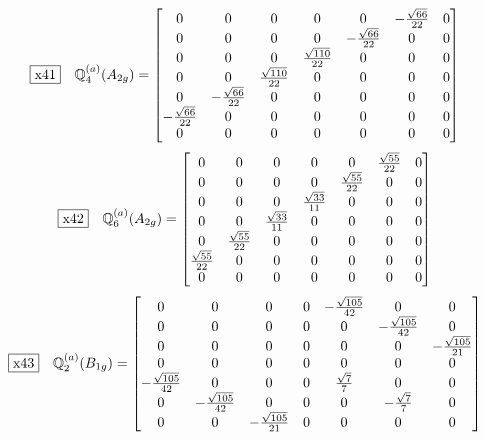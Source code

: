 \documentclass[fleqn,10pt,landscape]{jsarticle}
\begin{document}
\begin{dmath*}
\fbox{x41}\quad \mathbb{Q}_{4}^{(a)}(A_{2g})=\begin{bmatrix} 0 & 0 & 0 & 0 & 0 & - \frac{\sqrt{66}}{22} & 0 \\ 0 & 0 & 0 & 0 & - \frac{\sqrt{66}}{22} & 0 & 0 \\ 0 & 0 & 0 & \frac{\sqrt{110}}{22} & 0 & 0 & 0 \\ 0 & 0 & \frac{\sqrt{110}}{22} & 0 & 0 & 0 & 0 \\ 0 & - \frac{\sqrt{66}}{22} & 0 & 0 & 0 & 0 & 0 \\ - \frac{\sqrt{66}}{22} & 0 & 0 & 0 & 0 & 0 & 0 \\ 0 & 0 & 0 & 0 & 0 & 0 & 0 \end{bmatrix}
\end{dmath*}
\begin{dmath*}
\fbox{x42}\quad \mathbb{Q}_{6}^{(a)}(A_{2g})=\begin{bmatrix} 0 & 0 & 0 & 0 & 0 & \frac{\sqrt{55}}{22} & 0 \\ 0 & 0 & 0 & 0 & \frac{\sqrt{55}}{22} & 0 & 0 \\ 0 & 0 & 0 & \frac{\sqrt{33}}{11} & 0 & 0 & 0 \\ 0 & 0 & \frac{\sqrt{33}}{11} & 0 & 0 & 0 & 0 \\ 0 & \frac{\sqrt{55}}{22} & 0 & 0 & 0 & 0 & 0 \\ \frac{\sqrt{55}}{22} & 0 & 0 & 0 & 0 & 0 & 0 \\ 0 & 0 & 0 & 0 & 0 & 0 & 0 \end{bmatrix}
\end{dmath*}
\begin{dmath*}
\fbox{x43}\quad \mathbb{Q}_{2}^{(a)}(B_{1g})=\begin{bmatrix} 0 & 0 & 0 & 0 & - \frac{\sqrt{105}}{42} & 0 & 0 \\ 0 & 0 & 0 & 0 & 0 & - \frac{\sqrt{105}}{42} & 0 \\ 0 & 0 & 0 & 0 & 0 & 0 & - \frac{\sqrt{105}}{21} \\ 0 & 0 & 0 & 0 & 0 & 0 & 0 \\ - \frac{\sqrt{105}}{42} & 0 & 0 & 0 & \frac{\sqrt{7}}{7} & 0 & 0 \\ 0 & - \frac{\sqrt{105}}{42} & 0 & 0 & 0 & - \frac{\sqrt{7}}{7} & 0 \\ 0 & 0 & - \frac{\sqrt{105}}{21} & 0 & 0 & 0 & 0 \end{bmatrix}
\end{dmath*}
\end{document}

